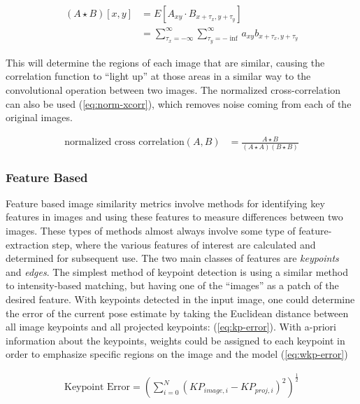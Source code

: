 \begin{equation}
    \begin{aligned}
        (A \star B)[x,y] &= E[A_{xy} \cdot B_{x + \tau_x,y+\tau_y}] \\
        &= \sum_{\tau_x=-\infty}^{\infty}\sum_{\tau_y=-\inf}^{\infty}a_{xy}b_{x + \tau_x,y + \tau_y}
    \end{aligned}
    \label{eq:xcorr}
\end{equation}

This will determine the regions of each image that are similar, causing the correlation function to ``light up'' at those areas in a similar way to the convolutional operation between two images.
The normalized cross-correlation can also be used (\cref{eq:norm-xcorr}), which removes noise coming from each of the original images.

\begin{equation}
    \begin{aligned}
        \text{normalized cross correlation}(A,B) &= \frac{A \star B}{(A \star A)(B \star B)}
    \end{aligned}\label{eq:norm-xcorr}
\end{equation}

\subsubsection{Feature Based}
\label{sec:img-sim-feature}
Feature based image similarity metrics involve methods for identifying key features in images and using these features to measure differences between two images.
These types of methods almost always involve some type of feature-extraction step, where the various features of interest are calculated and determined for subsequent use.
The two main classes of features are \emph{keypoints} and \emph{edges}.
The simplest method of keypoint detection is using a similar method to intensity-based matching, but having one of the ``images'' as a patch of the desired feature.
With keypoints detected in the input image, one could determine the error of the current pose estimate by taking the Euclidean distance between all image keypoints and all projected keypoints: \cite{burtonAutomaticTrackingHealthy2021} (\cref{eq:kp-error}).
With a-priori information about the keypoints, weights could be assigned to each keypoint in order to emphasize specific regions on the image and the model (\cref{eq:wkp-error})

\begin{equation}
    \begin{aligned}
        \text{Keypoint Error}= (\sum_{i = 0}^{N}(KP_{image,i} - KP_{proj,i})^2)^{\frac{1}{2}}
    \end{aligned}
    \label{eq:kp-error}
\end{equation}


